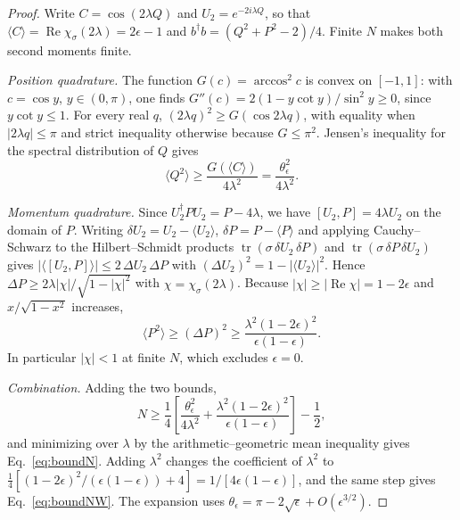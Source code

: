 \documentclass[aps,pre,onecolumn,superscriptaddress,floatfix,longbibliography]{revtex4-2}
\begin{document}
\begin{proof}
Write $C=\cos(2\lambda Q)$ and $U_2=e^{-2i\lambda Q}$, so that $\langle C\rangle=\operatorname{Re}\chi_\sigma(2\lambda)=2\epsilon-1$ and $b^\dagger b=(Q^2+P^2-2)/4$. Finite $N$ makes both second moments finite.

\emph{Position quadrature.} The function $G(c)=\arccos^2c$ is convex on $[-1,1]$: with $c=\cos y$, $y\in(0,\pi)$, one finds $G''(c)=2(1-y\cot y)/\sin^2y\ge0$, since $y\cot y\le1$. For every real $q$, $(2\lambda q)^2\ge G(\cos2\lambda q)$, with equality when $|2\lambda q|\le\pi$ and strict inequality otherwise because $G\le\pi^2$. Jensen's inequality for the spectral distribution of $Q$ gives
\begin{equation}
\langle Q^2\rangle\ge\frac{G(\langle C\rangle)}{4\lambda^2}=\frac{\theta_\epsilon^2}{4\lambda^2}.
\end{equation}

\emph{Momentum quadrature.} Since $U_2^\dagger PU_2=P-4\lambda$, we have $[U_2,P]=4\lambda U_2$ on the domain of $P$. Writing $\delta U_2=U_2-\langle U_2\rangle$, $\delta P=P-\langle P\rangle$ and applying Cauchy--Schwarz to the Hilbert--Schmidt products $\operatorname{tr}(\sigma\,\delta U_2\,\delta P)$ and $\operatorname{tr}(\sigma\,\delta P\,\delta U_2)$ gives $|\langle[U_2,P]\rangle|\le2\,\Delta U_2\,\Delta P$ with $(\Delta U_2)^2=1-|\langle U_2\rangle|^2$. Hence $\Delta P\ge2\lambda|\chi|/\sqrt{1-|\chi|^2}$ with $\chi=\chi_\sigma(2\lambda)$. Because $|\chi|\ge|\operatorname{Re}\chi|=1-2\epsilon$ and $x/\sqrt{1-x^2}$ increases,
\begin{equation}
\langle P^2\rangle\ge(\Delta P)^2\ge\frac{\lambda^2(1-2\epsilon)^2}{\epsilon(1-\epsilon)}.
\end{equation}
In particular $|\chi|<1$ at finite $N$, which excludes $\epsilon=0$.

\emph{Combination.} Adding the two bounds,
\begin{equation}
N\ge\frac14\left[\frac{\theta_\epsilon^2}{4\lambda^2}+\frac{\lambda^2(1-2\epsilon)^2}{\epsilon(1-\epsilon)}\right]-\frac12,
\end{equation}
and minimizing over $\lambda$ by the arithmetic--geometric mean inequality gives Eq.~\eqref{eq:boundN}. Adding $\lambda^2$ changes the coefficient of $\lambda^2$ to $\tfrac14[(1-2\epsilon)^2/(\epsilon(1-\epsilon))+4]=1/[4\epsilon(1-\epsilon)]$, and the same step gives Eq.~\eqref{eq:boundNW}. The expansion uses $\theta_\epsilon=\pi-2\sqrt\epsilon+O(\epsilon^{3/2})$.
\end{proof}
\end{document}

